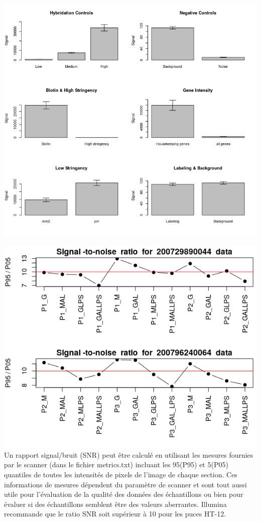\documentclass[a4paper,10pt]{article}
\begin{document}
\begin{center}
 \includegraphics[scale=0.7]{../../R/output/SummaryControl.png}
\end{center}
\begin{center}
 \includegraphics[scale=0.5]{../../R/output/signal_to_noise.png}
 Un rapport signal/bruit (SNR) peut être calculé en utilisant les mesures fournies par le scanner (dans le fichier metrics.txt) incluant les 95(P95) et 5(P05) quantiles de toutes les intensités de pixels de  l’image de chaque section. 
 Ces informations de mesures dépendent du paramètre de scanner et sont tout aussi utile pour l’évaluation de la qualité des données des échantillons ou bien pour évaluer si des échantillons semblent être des valeurs aberrantes. 
 Illumina recommande que le ratio SNR soit supérieur à 10 pour les puces HT-12.
\end{center}
\end{document}
